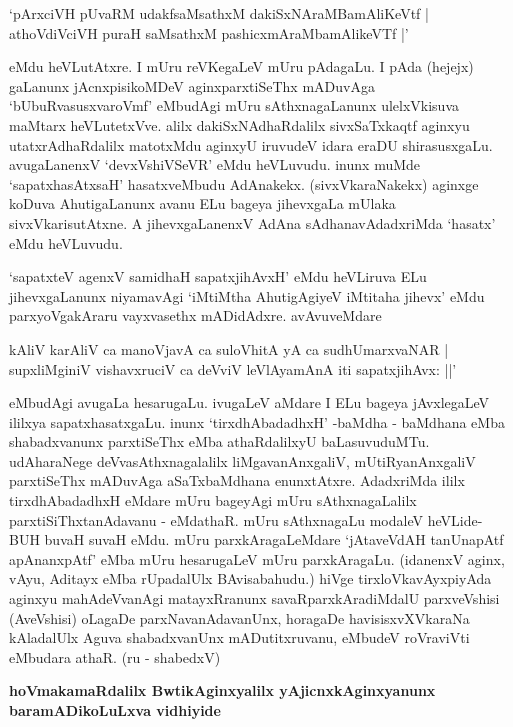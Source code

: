 \begin{shloka}
`pArxciVH pUvaRM udakfsaMsathxM dakiSxNAraMBamAliKeVtf |\\\label{210}
athoVdiVciVH puraH saMsathxM pashicxmAraMbamAlikeVTf |'
\end{shloka}

eMdu heVLutAtxre. I mUru reVKegaLeV mUru pAdagaLu. I pAda (hejejx) gaLanunx jAcnxpisikoMDeV aginxparxtiSeThx mADuvAga `bUbuRvasusxvaroVmf' eMbudAgi mUru sAthxnagaLanunx ulelxVkisuva maMtarx heVLutetxVve. alilx dakiSxNAdhaRdalilx sivxSaTxkaqtf aginxyu utatxrAdhaRdalilx matotxMdu aginxyU iruvudeV idara eraDU shirasusxgaLu. avugaLanenxV `devxVshiVSeVR' eMdu heVLuvudu. inunx muMde `sapatxhasAtxsaH' hasatxveMbudu AdAnakekx. (sivxVkaraNakekx) aginxge koDuva AhutigaLanunx avanu ELu bageya jihevxgaLa mUlaka sivxVkarisutAtxne. A jihevxgaLanenxV AdAna sAdhanavAdadxriMda `hasatx' eMdu heVLuvudu.

`sapatxteV agenxV samidhaH sapatxjihAvxH'\label{210} eMdu heVLiruva ELu jihevxgaLanunx niyamavAgi `iMtiMtha AhutigAgiyeV iMtitaha jihevx' eMdu parxyoVgakAraru vayxvasethx mADidAdxre. avAvuveMdare

\begin{shloka}
kAliV karAliV ca manoVjavA ca suloVhitA yA ca sudhUmarxvaNAR |\\\label{210}
supxliMginiV vishavxruciV ca deVviV leVlAyamAnA iti sapatxjihAvx: ||'
\end{shloka}

eMbudAgi avugaLa hesarugaLu. ivugaLeV aMdare I ELu bageya jAvxlegaLeV ililxya sapatxhasatxgaLu. inunx `tirxdhAbadadhxH' -baMdha - baMdhana eMba shabadxvanunx parxtiSeThx eMba athaRdalilxyU baLasuvuduMTu. udAharaNege deVvasAthxnagalalilx liMgavanAnxgaliV, mUtiRyanAnxgaliV parxtiSeThx mADuvAga aSaTxbaMdhana enunxtAtxre. AdadxriMda ililx tirxdhAbadadhxH eMdare mUru bageyAgi mUru sAthxnagaLalilx parxtiSiThxtanAdavanu - eMdathaR. mUru sAthxnagaLu modaleV heVLide- BUH buvaH suvaH eMdu. mUru parxkAragaLeMdare `jAtaveVdAH tanUnapAtf apAnanxpAtf' eMba mUru hesarugaLeV mUru parxkAragaLu. (idanenxV aginx, vAyu, Aditayx eMba rUpadalUlx BAvisabahudu.) hiVge tirxloVkavAyxpiyAda aginxyu mahAdeVvanAgi matayxRranunx savaRparxkAradiMdalU parxveVshisi (AveVshisi) oLagaDe parxNavanAdavanUnx, horagaDe havisisxvXVkaraNa kAladalUlx Aguva shabadxvanUnx mADutitxruvanu, eMbudeV roVraviVti eMbudara athaR. (ru - shabedxV)

\noindent
{\bf\large{hoVmakamaRdalilx BwtikAginxyalilx yAjicnxkAginxyanunx baramADikoLuLxva vidhiyide}}\label{page211}

